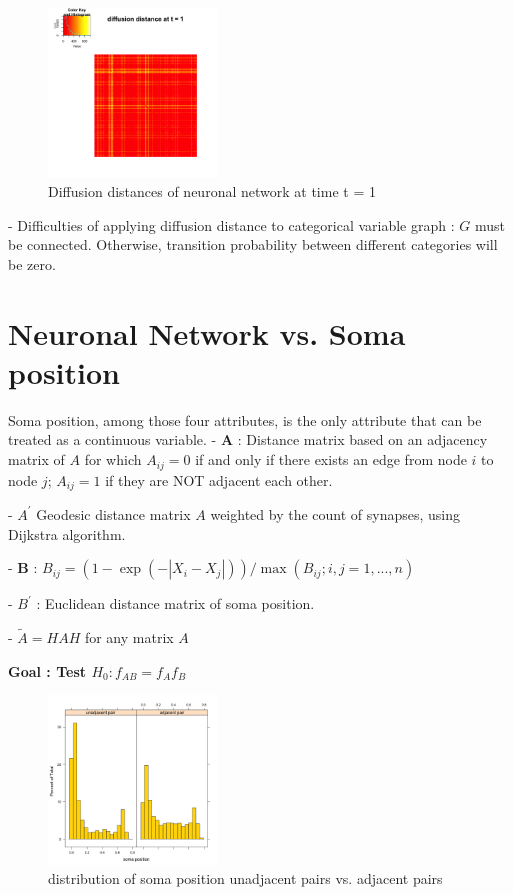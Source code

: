 \documentclass[12pt]{report}
\begin{document}
 
 
\begin{figure}[H]
\captionsetup{format=plain}
\centering
\includegraphics[width=0.4\textwidth]{../figure/diffusion1.png}
\caption{Diffusion distances of neuronal network at time t = 1}
\label{fig:statd}
\end{figure} 
 
 
- Difficulties of applying diffusion distance to categorical variable graph : $G$ must be connected. Otherwise, transition probability between different categories will be zero.  
 
 \section{Neuronal Network vs. Soma position}
 
 Soma position, among those four attributes, is the only attribute that can be treated as a continuous variable.
 - $\textbf{A}$ :  Distance matrix based on an adjacency matrix of $A$ for which $A_{ij} = 0$ if and only if there exists an edge from node $i$ to node $j$; $A_{ij} = 1$ if they are NOT adjacent each other. 

- \textbf{$A^\prime$} Geodesic distance matrix $A$ weighted by the count of synapses, using Dijkstra algorithm.
  
- $\textbf{B}$ : $B_{ij} = (1 - \exp(-|X_{i} - X_{j}|)) / \max(B_{ij} ; i,j = 1,...,n)$

- \textbf{$B^\prime$} : Euclidean distance matrix of soma position.

- $\tilde{A} = H A H$ for any matrix $A$



\begin{center}\textbf{Goal : Test $H_{0} : f_{AB} = f_{A}f_{B}$}
\end{center} 
 
\begin{figure}[H]
\captionsetup{format=plain}
\centering
\includegraphics[width=0.4\textwidth]{../figure/histo1.png}
\caption{distribution of soma position unadjacent pairs vs. adjacent pairs}
\label{fig:histo1}
\end{figure}  
 
\end{document}
